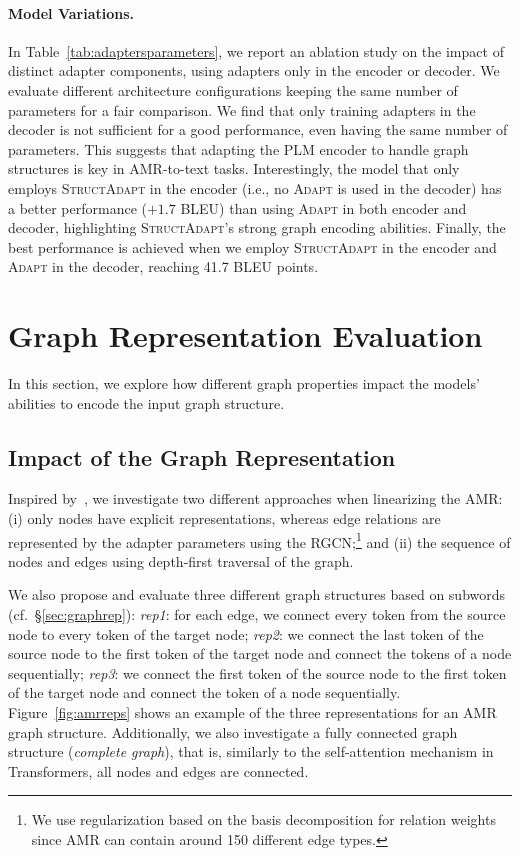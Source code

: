 \documentclass[11pt]{article}
\newcommand{\graphadapter}{{\small\textsc{StructAdapt}}\xspace}
\newcommand{\vanilladapter}{{\small\textsc{Adapt}}\xspace}
\begin{document}
\paragraph{Model Variations.}

In Table~\ref{tab:adaptersparameters}, we report an ablation study on the impact of distinct adapter components, using adapters only in the encoder or decoder. We evaluate different architecture configurations keeping the same number of parameters for a fair comparison. We find that only training adapters in the decoder is not sufficient for a good performance, even having the same number of parameters. This suggests that adapting the PLM encoder to handle graph structures is key in AMR-to-text tasks. Interestingly, the model that only employs \graphadapter in the encoder (i.e., no \vanilladapter is used in the decoder) has a better performance ($+1.7$ BLEU) than using \vanilladapter in both encoder and decoder, highlighting \graphadapter's strong graph encoding abilities. Finally, the best performance is achieved when we employ \graphadapter in the encoder and \vanilladapter in the decoder, reaching 41.7 BLEU points.

\section{Graph Representation Evaluation}
\label{sec:graphrepeval}

In this section, we explore how different graph properties impact the models' abilities to encode the input graph structure.

\subsection{Impact of the Graph Representation}
\label{sec:amrinputrep}
 Inspired by~\citet{damonte-cohen-2019-structural}, we investigate two different approaches when linearizing the AMR: (i) only nodes have explicit representations, whereas edge relations are represented by the adapter parameters using the RGCN;\footnote{We use regularization based on the basis decomposition for relation weights \cite{Schlichtkrull2018ModelingRD} since AMR can contain around 150 different edge types.} and (ii) the sequence of nodes and edges using depth-first traversal of the graph. 
 
 We also propose and evaluate three different graph structures based on subwords (cf.\ \S\ref{sec:graphrep}): \emph{rep1}: for each edge, we connect every token from the source node to every token of the target node; \emph{rep2}: we connect the last token of the source node to the first token of the target node and connect the tokens of a node sequentially; \emph{rep3}: we connect the first token of the source node to the first token of the target node and connect the token of a node sequentially. Figure~\ref{fig:amrreps} shows an example of the three representations for an AMR graph structure. Additionally, we also investigate a fully connected graph structure (\emph{complete graph}), that is, similarly to the self-attention mechanism in Transformers, all nodes and edges are connected.
 
\end{document}
